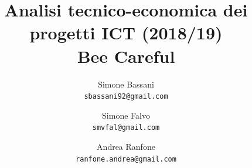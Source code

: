 \documentclass[a4paper,titlepage]{article}
\begin{document}

\title{
  Analisi tecnico-economica dei progetti ICT (2018/19)\\[20pt]
  Bee Careful
}
\author{
  Simone Bassani\\
  \texttt{sbassani92@gmail.com}
  \and
  Simone Falvo\\
  \texttt{smvfal@gmail.com}
  \and
  Andrea Ranfone\\
  \texttt{ranfone.andrea@gmail.com}
}

\date{}


\maketitle

%

\tableofcontents
\newpage




\end{document}
